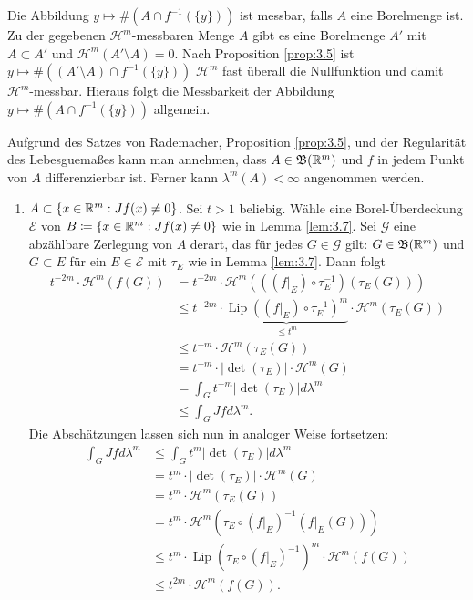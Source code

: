 \documentclass[a4paper,twoside,DIV15,BCOR12mm]{scrbook}
\newcommand{\borel}{\mathfrak B}
\newcommand{\HM}{\mathscr H}
\DeclareMathOperator{\Lip}{Lip}
\begin{document}
\begin{beweis}
Die Abbildung $y\mapsto \#(A\cap f^{-1}(\{y\}))$ ist messbar, falls $A$ eine Borelmenge ist. Zu der
gegebenen $\HM^m$-messbaren Menge $A$ gibt es eine Borelmenge $A'$ mit $A\subset A'$ und $\HM^m(A'\setminus A)=0$. 
Nach Proposition \ref{prop:3.5} ist $y\mapsto \#((A'\setminus A)\cap f^{-1}(\{y\}))$ 
$\HM^m$ fast überall die Nullfunktion und damit $\HM^m$-messbar. Hieraus folgt die Messbarkeit 
der Abbildung $y\mapsto \#(A\cap f^{-1}(\{y\}))$ allgemein. 


Aufgrund des Satzes von Rademacher, Proposition \ref{prop:3.5}, und der Regularität des Lebesguemaßes kann man annehmen, dass $A\in\borel(\MdR^m)$ und $f$ in jedem Punkt von $A$ differenzierbar ist. Ferner kann $\lambda^m(A) < \infty$ angenommen werden.
\begin{enumerate}[{Fall} (a):]
\item $A\subset \{x\in\mathbb{R}^m: Jf(x)\ne 0\}$. Sei $t>1$ beliebig. Wähle eine Borel-Überdeckung $\mathcal E$ von $B\da \{x\in\MdR^m: Jf(x) \ne 0\}$ wie in Lemma \ref{lem:3.7}. Sei $\mathcal G$ eine abzählbare Zerlegung von $A$ derart, das für jedes $G\in\mathcal G$ gilt: $G\in \borel(\MdR^m)$ und $G\subset E$ für ein $E\in\mathcal E$ mit  $\tau_E$ wie in Lemma \ref{lem:3.7}. Dann folgt
\begin{align*}
t^{-2m}\cdot\HM^m(f(G)) 
&= t^{-2m} \cdot \HM^m( ( (f|_E)\circ\tau_E^{-1}) (\tau_E(G)) ) \\
&\le t^{-2m} \cdot \underbrace{\Lip( (f|_E)\circ\tau_E^{-1})^m}_{\le t^m} \cdot \HM^m(\tau_E(G))\\
&\le t^{-m} \cdot \HM^m(\tau_E(G))\\
&= t^{-m} \cdot |\det(\tau_E)| \cdot \HM^m(G) \\
&=\int_G t^{-m} |\det(\tau_E)| d\lambda^m \\
&\le \int_G Jfd\lambda^m.
\end{align*}
Die Abschätzungen lassen sich nun in analoger Weise fortsetzen:
\begin{align*}
\int_G Jfd\lambda^m
&\le \int_G t^m |\det(\tau_E)| d\lambda^m \\
&= t^m \cdot |\det(\tau_E)| \cdot \HM^m(G) \\
&= t^m \cdot \HM^m(\tau_E(G)) \\
&= t^m \cdot \HM^m(\tau_E \circ (f|_E)^{-1} (f|_E(G))) \\
&\le t^m \cdot \Lip(\tau_E \circ (f|_E)^{-1})^m \cdot \HM^m(f(G)) \\
&\le t^{2m} \cdot \HM^m(f(G)).
\end{align*}

\end{enumerate}
\end{beweis}
\end{document}
